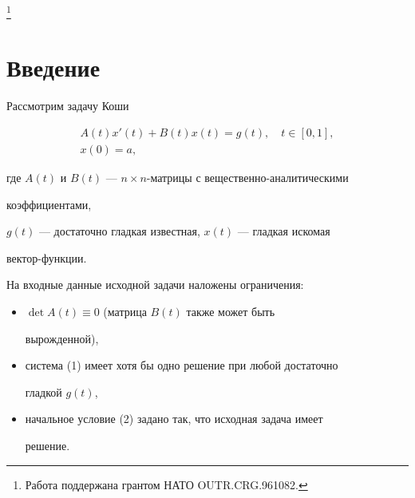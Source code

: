 \thanks{Работа поддержана грантом НАТО OUTR.CRG.961082.}


\date{}







\pagestyle{plain} %













\maketitle










\section{Введение}





Рассмотрим задачу Коши


\begin{gather}


A(t)x'(t)+B(t)x(t)=g(t),\quad t\in[0,1],\\


x(0)=a,


\end{gather}


где $A(t)$ и $B(t)$ --- $n\times n$-матрицы с вещественно-аналитическими


коэффициентами,


$g(t)$ --- достаточно гладкая известная, $x(t)$ --- гладкая искомая


вектор-функции.





На входные данные исходной задачи наложены ограничения:


\begin{itemize}


\item[а)] $\det A(t)\equiv 0$ (матрица $B(t)$ также может быть


вырожденной),\\


\item[б)] система (1) имеет хотя бы одно решение при любой достаточно


гладкой $g(t)$,\\


\item[в)] начальное условие (2) задано так, что исходная задача имеет


решение.


\end{itemize}





